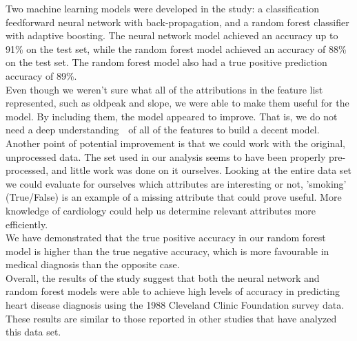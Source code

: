 \documentclass[reprint,english,notitlepage]{revtex4-1}  %
\begin{document}
Two machine learning models were developed in the study: a classification feedforward neural network with back-propagation, and a random forest classifier with adaptive boosting. The neural network model achieved an accuracy up to 91\% on the test set, while the random forest model achieved an accuracy of 88\% on the test set. The random forest model also had a true positive prediction accuracy of 89\%.
\vspace{3mm}
\\
Even though we weren't sure what all of the attributions in the feature list represented, such as oldpeak and slope, we were able to make them useful for the model. By including them, the model appeared to improve. That is, we do not need a deep understanding  of all of the features to build a decent model.
\vspace{3mm}
\\
Another point of potential improvement is that we could work with the original, unprocessed data. The set used in our analysis seems to have been properly pre-processed, and little work was done on it ourselves. Looking at the entire data set we could evaluate for ourselves which attributes are interesting or not, 'smoking' (True/False) is an example of a missing attribute that could prove useful. More knowledge of cardiology could help us determine relevant attributes more efficiently.
\vspace{3mm}
\\
We have demonstrated that the true positive accuracy in our random forest model is higher than the true negative accuracy, which is more favourable in medical diagnosis than the opposite case.
\vspace{3mm}
\\
Overall, the results of the study suggest that both the neural network and random forest models were able to achieve high levels of accuracy in predicting heart disease diagnosis using the 1988 Cleveland Clinic Foundation survey data. These results are similar to those reported in other studies that have analyzed this data set.



\end{document}
